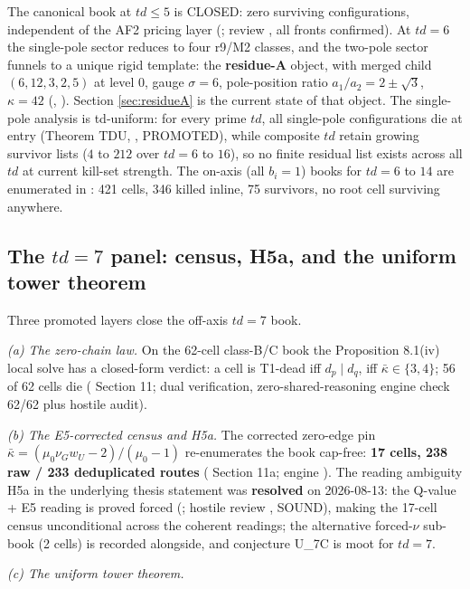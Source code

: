 \documentclass[11pt]{article}
\theoremstyle{definition}
\theoremstyle{remark}
\begin{document}
The canonical book at $td\le 5$ is CLOSED: zero surviving configurations,
independent of the AF2 pricing layer (;
review , all fronts confirmed). At $td=6$ the
single-pole sector reduces to four r9/M2 classes, and the two-pole sector
funnels to a unique rigid template: the \textbf{residue-A} object, with
merged child $(6,12,3,2,5)$ at level $0$, gauge $\sigma=6$, pole-position
ratio $a_1/a_2=2\pm\sqrt3$, $\kappa=42$
(, ). Section \ref{sec:residueA}
is the current state of that object. The single-pole analysis is
td-uniform: for every prime $td$, all single-pole configurations die at
entry (Theorem TDU, , PROMOTED), while composite
$td$ retain growing survivor lists ($4$ to $212$ over $td=6$ to $16$), so no
finite residual list exists across all $td$ at current kill-set strength.
The on-axis (all $b_i=1$) books for $td=6$ to $14$ are enumerated in
: 421 cells, 346 killed inline, 75 survivors, no root cell
surviving anywhere.

\subsection{The $td=7$ panel: census, H5a, and the uniform tower theorem}

Three promoted layers close the off-axis $td=7$ book.

\emph{(a) The zero-chain law.} On the 62-cell class-B/C book the
Proposition 8.1(iv) local solve has a closed-form verdict: a cell is
T1-dead iff $d_p\mid d_q$, iff $\bar\kappa\in\{3,4\}$; 56 of 62 cells die
( Section 11; dual verification, zero-shared-reasoning
engine check 62/62 plus hostile audit).

\emph{(b) The E5-corrected census and H5a.} The corrected zero-edge pin
$\bar\kappa=(\mu_0\nu_G w_U-2)/(\mu_0-1)$ re-enumerates the book cap-free:
\textbf{17 cells, 238 raw / 233 deduplicated routes}
( Section 11a; engine ).
The reading ambiguity H5a in the underlying thesis statement was
\textbf{resolved} on 2026-08-13: the Q-value + E5 reading is proved forced
(; hostile review ,
SOUND), making the 17-cell census unconditional across the coherent
readings; the alternative forced-$\nu$ sub-book (2 cells) is recorded
alongside, and conjecture U\_7C is moot for $td=7$.

\emph{(c) The uniform tower theorem.}
\end{document}
